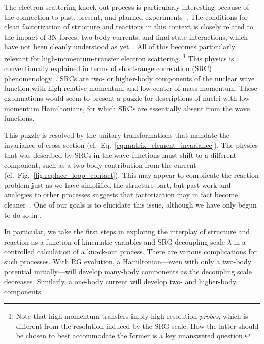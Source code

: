 	The electron scattering knock-out process is particularly interesting because
	of the connection to past, present, and planned
	experiments~\cite{Boffi:1996, LENP_white_paper2015}.
	The conditions for clean factorization
	of structure and reactions in this context is closely related to the impact of
	3N forces,
	two-body currents, and final-state interactions, which have not been cleanly
	understood as yet~\cite{Furnstahl:2010wd}.
	All of this becomes particularly relevant for high-momentum-transfer electron
	scattering.%
	\footnote{Note that high-momentum transfers imply high-resolution
	\emph{probes}, which is different from the resolution induced by the SRG
	scale.  How the latter should be chosen to best
	accommodate the former is a key unanswered question.}
	This physics is conventionally explained in terms of short-range correlation
	(SRC) phenomenology~\cite{Frankfurt:2008zv,Atti:2015eda}.  SRCs are two- or
	higher-body components of the nuclear wave function with high relative
	momentum and low center-of-mass momentum.  These explanations would seem to
	present a	puzzle for descriptions of nuclei with low-momentum Hamiltonians,
	for which	SRCs are essentially absent from the wave functions.

	This puzzle is resolved by the unitary transformations that mandate the
	invariance of cross section (cf.~Eq.~\eqref{eq:matrix_element_invariance}).
	The physics that was described by SRCs in the
	wave functions must shift to a different component, such as a two-body
	contribution from the current (cf.~Fig.~\ref{fig:replace_loop_contact}).
	This may appear to complicate the reaction
	problem just as we have simplified the structure part, but past work and
	analogies to other processes suggests that factorization may in fact
	become cleaner~\cite{Anderson:2010aq,Bogner:2012zm}.  One of our goals is to
	elucidate this issue, although we have only begun to do so in
	\cite{More:2015tpa}.

	In particular, we take the first steps in exploring the interplay of
	structure and reaction as a function of kinematic variables and SRG decoupling
	scale $\lambda$ in a controlled calculation of a knock-out process.  There are
	various complications for such processes.  With RG evolution, a
	Hamiltonian---even with only a two-body potential initially---will develop
	many-body components as the decoupling scale decreases.  Similarly, a one-body
	current will develop two- and higher-body components.

